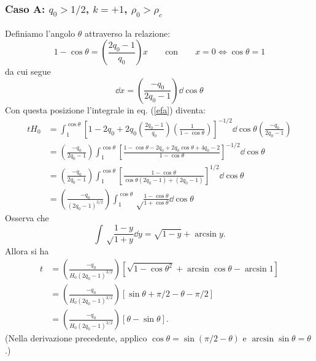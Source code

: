 \subsubsection{Caso A: $q_0 > 1/2$, $k=+1$, $\rho_0> \rho_c$}

Definiamo l'angolo $\theta$ attraverso la relazione:
\begin{equation}
  1-\cos \theta = \left(\frac{2q_0-1 }{q_0}\right) x \qquad\text{con}\qquad x=0
  \iff \cos \theta=1
  \label{posizioneiniziale}
\end{equation}
da cui segue
\begin{equation}
  \dd x =   \left(\frac{- q_0}{2q_0-1}\right)  \dd \cos \theta
\end{equation}
Con questa posizione l'integrale in eq. (\ref{efa}) diventa:
\begin{equation}
  \begin{split}
    t H_0 &= \int _1^{\cos \theta} \left[1-2q_0+2q_0 \left(\frac{2q_0-1}{q_0}
      \right) \left(\frac{1}{1-\cos \theta} \right) \right]^{-1/2} \dd\cos\theta
    \left(\frac{-q_0}{2q_0-1} \right) \\
    &=\left( \frac{-q_0}{2q_0-1} \right) \int _1^{\cos \theta} \left[
      \frac{1-\cos \theta - 2q_0 + 2q_0 \cos \theta + 4q_0 -2} {1-\cos\theta}
    \right]^{-1/2} \dd\cos\theta \\
    &=\left( \frac {-q_0}{2q_0-1} \right) \int _1^{\cos \theta} \left[ \frac
      {1-\cos \theta} {\cos \theta (2q_0-1) + (2q_0-1)} \right]^{1/2}
    \dd\cos\theta \\
    &= \left( \frac {-q_0}{(2q_0-1)^{3/2}} \right) \int_1^{\cos \theta} \sqrt
    \frac{1-\cos \theta}{1+\cos \theta} \dd \cos \theta
  \end{split}
\end{equation}
Osserva che
\begin{equation}
  \int \sqrt \frac {1-y}{1+y} \dd y = \sqrt {1-y} + \arcsin y.
\end{equation}
Allora si ha
\begin{equation}
  \begin{split}
    t & = \left( \frac {-q_0}{H_0 (2q_0-1)^{3/2}} \right)
    \left[ \sqrt {1-\cos\theta^2} + \arcsin \cos \theta - \arcsin 1 \right] \\
    & = \left( \frac {-q_0}{H_0(2q_0-1)^{3/2}} \right) \left[ \sin \theta +
      {\pi}/{2} - \theta - {\pi}/{2}\right] \\
    & = \left( \frac {-q_0}{H_0(2q_0-1)^{3/2}} \right) \left[ \theta - \sin \theta
    \right].
    \label{sema}
  \end{split}
\end{equation}
(Nella derivazione precedente, applico $\cos \theta = \sin (\pi/2-\theta)$ e
$\arcsin \sin \theta = \theta$.)

